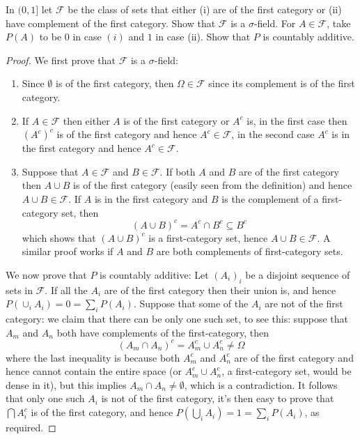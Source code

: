 \documentclass[11pt]{article}
\newcommand{\F}{\mathcal{F}}
\newcommand{\seq}{\subseteq}
\newcommand{\Om}{\Omega}
\newcommand{\es}{\emptyset}
\newcommand{\un}{\cup}
\newcommand{\ic}{\cap}
\newenvironment{exercise}[2][Exercise]{\begin{trivlist}
\item[\hskip \labelsep {\bfseries #1}\hskip \labelsep {\bfseries #2.}]}{\end{trivlist}}
\begin{document}
\begin{exercise}{2.14}
    In $(0, 1]$ let $\F$ be the class of sets that either (i) are of the first category or (ii) have complement of the first category. Show that $\F$ is a $\sigma$-field. For $A \in \F$, take $P(A)$ to be $0$ in case $(i)$ and $1$ in case (ii). Show that $P$ is countably additive.
\end{exercise}
\begin{proof}
    We first prove that $\F$ is a $\sigma$-field:
    \begin{enumerate}
        \item Since $\es$ is of the first category, then $\Omega \in \F$ since its complement is of the first category.
        \item If $A \in \F$ then either $A$ is of the first category or $A^{c}$ is, in the first case then $(A^{c})^{c}$ is of the first category and hence $A^{c} \in \F$, in the second case $A^{c}$ is in the first category and hence $A^{c} \in \F$.
        \item Suppose that $A \in \F$ and $B \in \F$. If both $A$ and $B$ are of the first category then $A \un B$ is of the first category (easily seen from the definition) and hence $A \un B \in \F$. If $A$ is in the first category and $B$ is the complement of a first-category set, then
        \[ (A \un B)^{c} = A^{c} \ic B^{c} \seq B^{c} \]
        which shows that $(A \un B)^{c}$ is a first-category set, hence $A \un B \in \F$. A similar proof works if $A$ and $B$ are both complements of first-category sets.
    \end{enumerate}
    We now prove that $P$ is countably additive: Let $(A_i)_i$ be a disjoint sequence of sets in $\F$. If all the $A_i$ are of the first category then their union is, and hence $P(\cup_i A_i) = 0 = \sum_i P(A_i)$. Suppose that some of the $A_i$ are not of the first category: we claim that there can be only one such set, to see this: suppose that $A_m$ and $A_n$ both have complements of the first-category, then 
    \[ (A_m \ic A_n)^{c} = A_m^{c} \un A_n^{c} \neq \Om \]
    where the last inequality is because both $A_m^{c}$ and $A_n^{c}$ are of the first category and hence cannot contain the entire space (or $A_m^{c} \un A_n^{c}$, a first-category set, would be dense in it), but this implies $A_m \ic A_n \neq \es$, which is a contradiction. It follows that only one such $A_i$ is not of the first category, it's then easy to prove that $\bigcap A_i^{c}$ is of the first category, and hence $P \left ( \bigcup_i A_i \right ) = 1 = \sum_i P(A_i)$, as required.
\end{proof}
\end{document}
